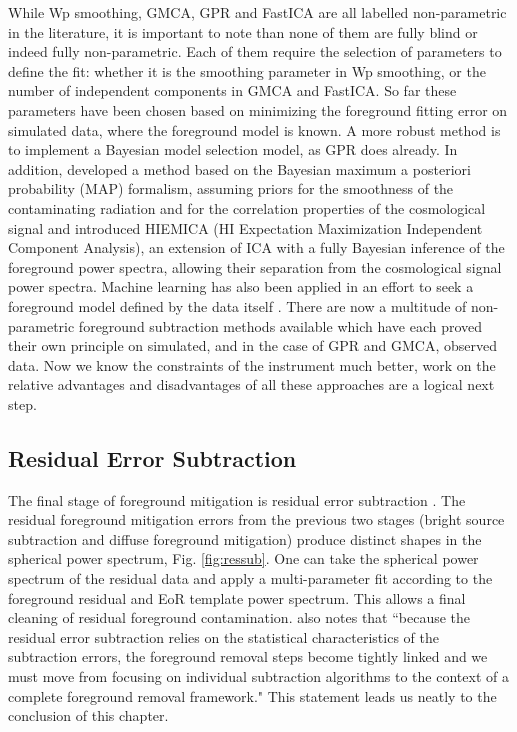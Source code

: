 While Wp smoothing, GMCA, GPR and FastICA are all labelled non-parametric in the literature, it is important to note than none of them are fully blind or indeed fully non-parametric. Each of them require the selection of parameters to define the fit: whether it is the smoothing parameter in Wp smoothing, or the number of independent components in GMCA and FastICA. So far these parameters have been chosen based on minimizing the foreground fitting error on simulated data, where the foreground model is known. A more robust method is to implement a Bayesian model selection model, as GPR does already. In addition, \cite{Gleser2008MNRAS.391..383G} developed a method based on the Bayesian maximum a posteriori probability (MAP) formalism, assuming priors for the smoothness of the contaminating radiation and for the correlation properties of the cosmological signal and \cite{Zhang2016ApJS..222....3Z} introduced HIEMICA (HI Expectation Maximization Independent Component Analysis), an extension of ICA with a fully Bayesian inference of the foreground power spectra, allowing their separation from the cosmological signal power spectra. Machine learning has also been applied in an effort to seek a foreground model defined by the data itself \cite{Li2019MNRAS.485.2628L}. There are now a multitude of non-parametric foreground subtraction methods available which have each proved their own principle on simulated, and in the case of GPR and GMCA, observed data. Now we know the constraints of the instrument much better, work on the relative advantages and disadvantages of all these approaches are a logical next step.

\subsection{Residual Error Subtraction}
The final stage of foreground mitigation is residual error subtraction \cite{Morales2006ApJ...648..767M,Morales2004ApJ...615....7M}. The residual foreground mitigation errors from the previous two stages (bright source subtraction and diffuse foreground mitigation) produce distinct shapes in the spherical power spectrum, Fig. \ref{fig:ressub}. One can take the spherical power spectrum of the residual data and apply a multi-parameter fit according to the foreground residual and EoR template power spectrum. This allows a final cleaning of residual foreground contamination. \cite{Morales2006ApJ...648..767M} also notes that ``because the residual error subtraction relies on the statistical characteristics of the subtraction errors, the foreground removal steps become tightly linked and we must move from focusing on individual subtraction algorithms to the context of a complete foreground removal framework." This statement leads us neatly to the conclusion of this chapter.

